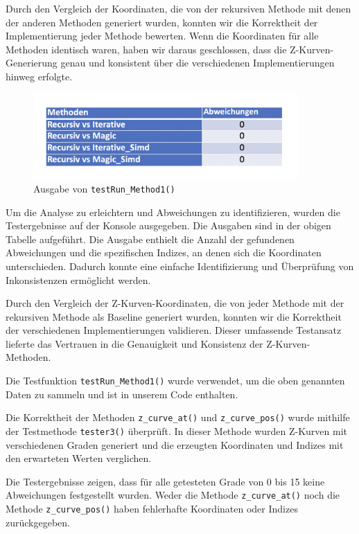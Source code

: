 \documentclass[course=erap]{aspdoc}
\begin{document}
\noindent Durch den Vergleich der Koordinaten, die von der rekursiven Methode mit denen der anderen Methoden generiert wurden, konnten wir die Korrektheit der Implementierung jeder Methode bewerten. Wenn die Koordinaten für alle Methoden identisch waren, haben wir daraus geschlossen, dass die Z-Kurven-Generierung genau und konsistent über die verschiedenen Implementierungen hinweg erfolgte.


\begin{figure}[H]
  \centering
  \includegraphics[width=0.9\textwidth]{korrektheit_data.png}
  \caption{Ausgabe von \texttt{testRun\_Method1()}}
  \label{fig:Ausgabe von testRun_Method1()}
\end{figure}

\noindent Um die Analyse zu erleichtern und Abweichungen zu identifizieren, wurden die Testergebnisse auf der Konsole ausgegeben. Die Ausgaben sind in der obigen Tabelle aufgeführt. Die Ausgabe enthielt die Anzahl der gefundenen Abweichungen und die spezifischen Indizes, an denen sich die Koordinaten unterschieden. Dadurch konnte eine einfache Identifizierung und Überprüfung von Inkonsistenzen ermöglicht werden.

\noindent Durch den Vergleich der Z-Kurven-Koordinaten, die von jeder Methode mit der rekursiven Methode als Baseline generiert wurden, konnten wir die Korrektheit der verschiedenen Implementierungen validieren. Dieser umfassende Testansatz lieferte das Vertrauen in die Genauigkeit und Konsistenz der Z-Kurven-Methoden.

\noindent Die Testfunktion \texttt{testRun\_Method1()} wurde verwendet, um die oben genannten Daten zu sammeln und ist in unserem Code enthalten.

\noindent Die Korrektheit der Methoden \texttt{z\_curve\_at()} und \texttt{z\_curve\_pos()} wurde mithilfe der Testmethode \texttt{tester3()} überprüft. In dieser Methode wurden Z-Kurven mit verschiedenen Graden generiert und die erzeugten Koordinaten und Indizes mit den erwarteten Werten verglichen.

\noindent Die Testergebnisse zeigen, dass für alle getesteten Grade von 0 bis 15 keine Abweichungen festgestellt wurden. Weder die Methode \texttt{z\_curve\_at()} noch die Methode \texttt{z\_curve\_pos()} haben fehlerhafte Koordinaten oder Indizes zurückgegeben.
\end{document}
